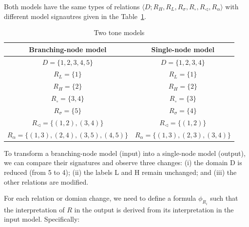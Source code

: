 Both models have the same types of 
relations 
$\langle D; R_H, R_L, R_\sigma, R_{\circ},R_\lhd,R_\alpha \rangle$ with different model signautres given in the Table~\ref{tab:tonalmodels}.


\begin{table}[ht!]
    \centering
    \begin{tabular}{c|c}
        \toprule
        \textbf{Branching-node model} & \textbf{Single-node model} \\
        \midrule
        $D = \{1,2,3,4,5\}$ & $D = \{1,2,3,4\}$ \\
        $R_L = \{1\}$ & $R_L = \{1\}$ \\
        $R_H = \{2\}$ & $R_H = \{2\}$ \\
        $R_{\circ} = \{3,4\}$ & $R_{\circ} = \{3\}$ \\
        $R_\sigma = \{5\}$ & $R_\sigma = \{4\}$ \\
        $R_\lhd = \{(1,2),(3,4)\}$ & $R_\lhd = \{(1,2)\}$ \\
        $R_\alpha = \{(1,3),(2,4),(3,5),(4,5)\}$ & $R_\alpha = \{(1,3),(2,3),(3,4)\}$ \\
        \bottomrule
    \end{tabular}
    \caption{Two tone models}
    \label{tab:tonalmodels}
\end{table}


To transform a branching-node model (input) into a single-node 
model (output), we can compare their signatures and observe three 
changes: (i) the domain D is reduced (from 5 to 4); (ii) the labels
L and H remain unchanged; and (iii) the other relations are modified.

For each relation or domian change, we need to define a formula 
$\phi_{R_i}$ such that the interpretation of $R$ in the output is 
derived from its interpretation in the input model.
Specifically:

